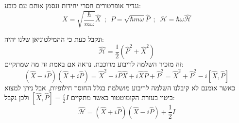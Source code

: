 \documentclass{tstextbook}
\begin{document}
\begin{symbolize}
נגדיר אופרטורים חסרי יחידות ונסמן אותם עם כובע:
$$X=\sqrt{\frac{\hbar}{m\omega}}\hat{X}\,\,\,;\,\,\,P=\sqrt{\hbar m\omega}\hat{P}\,\,\,;\,\,\,\mathcal{H}=\hbar\omega\hat{\mathcal{H}}$$

\end{symbolize}
ונקבל כעת כי ההמילטוניאן שלנו יהיה:
$$\hat{\mathcal{H}}=\frac{1}{2}\left(\hat{P}^{2}+\hat{X}^{2}\right)$$
זה מזכיר השלמה לריבוע מרוכבת. נראה אם באמת זה מה שמתקיים:
$$\left( \hat{X}-i\hat{P} \right)\left( \hat{X}+i\hat{P} \right)=\hat{X}^2-i\hat{P}\hat{X}+i\hat{X}\hat{P} + \hat{P}^2=\hat{X}^2 +\hat{P}^2 -i\left[ \hat{X},\hat{P} \right]$$
כאשר אומנם לא קיבלנו השלמה לריבוע מושלמת בגלל החוסר חילופיות, אבל ניתן למצוא ביטוי בעזרת הקומוטטור כאשר מתקיים \(\left[ \hat{X},\hat{P} \right]=\frac{i}{2}I\) ולכן נקבל:
$$\hat{\mathcal{H}}=\left( \hat{X}+i\hat{P} \right)\left( \hat{X}-i\hat{P} \right)+\frac{1}{2}I$$
\end{document}
